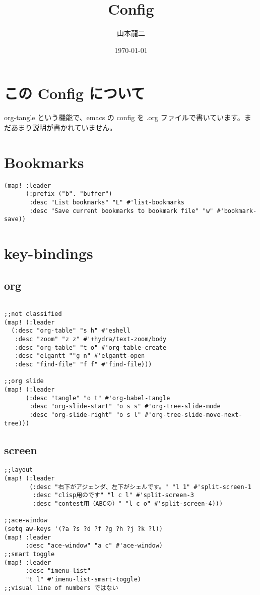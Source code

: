 \documentclass[11pt]{article}
\author{山本龍二}
\date{\today}
\title{Config}
\begin{document}
\maketitle
\tableofcontents


\section{この Config について}
\label{sec:org25204b7}
org-tangle という機能で、emacs の config を
.org ファイルで書いています。まだあまり説明が書かれていません。
\section{Bookmarks}
\label{sec:org5dd7b7e}
\begin{verbatim}
(map! :leader
      (:prefix ("b". "buffer")
       :desc "List bookmarks" "L" #'list-bookmarks
       :desc "Save current bookmarks to bookmark file" "w" #'bookmark-save))
\end{verbatim}

\section{key-bindings}
\label{sec:orgb14201c}
\subsection{org}
\label{sec:org0fd931e}
\begin{verbatim}

;;not classified
(map! (:leader
  (:desc "org-table" "s h" #'eshell
   :desc "zoom" "z z" #'+hydra/text-zoom/body
   :desc "org-table" "t o" #'org-table-create
   :desc "elgantt ""g n" #'elgantt-open
   :desc "find-file" "f f" #'find-file)))

;;org slide
(map! (:leader
      (:desc "tangle" "o t" #'org-babel-tangle
       :desc "org-slide-start" "o s s" #'org-tree-slide-mode
       :desc "org-slide-right" "o s l" #'org-tree-slide-move-next-tree)))

\end{verbatim}

\subsection{screen}
\label{sec:orgc15097b}
\begin{verbatim}
;;layout
(map! (:leader
       (:desc "右下がアジェンダ、左下がシェルです。" "l 1" #'split-screen-1
        :desc "clisp用のです" "l c l" #'split-screen-3
        :desc "contest用（ABCの）" "l c o" #'split-screen-4)))

;;ace-window
(setq aw-keys '(?a ?s ?d ?f ?g ?h ?j ?k ?l))
(map! :leader
      :desc "ace-window" "a c" #'ace-window)
;;smart toggle
(map! :leader
      :desc "imenu-list"
      "t l" #'imenu-list-smart-toggle)
;;visual line of numbers ではない
\end{verbatim}
\end{document}
